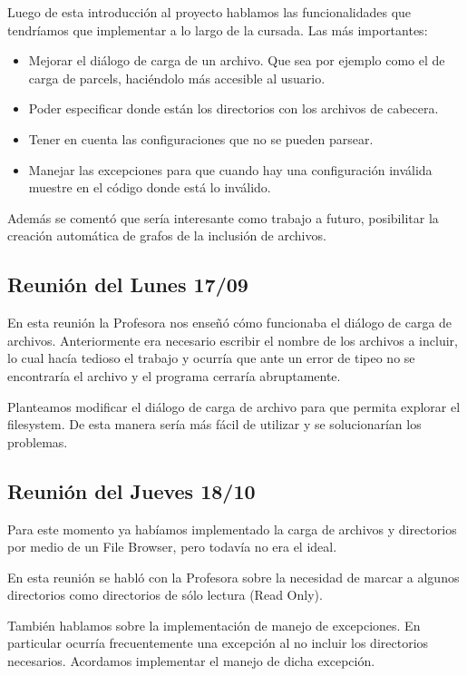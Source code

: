 \documentclass[a4paper,oneside,12pt]{article}
\begin{document}
Luego de esta introducci\'on al proyecto hablamos las funcionalidades que tendr\'iamos que implementar a lo largo de la cursada. Las m\'as importantes:

\begin{itemize}
  \item Mejorar el di\'alogo de carga de un archivo. Que sea por ejemplo como el de carga de parcels, haci\'endolo m\'as accesible al usuario.
  \item Poder especificar donde est\'an los directorios con los archivos de cabecera.
  \item Tener en cuenta las configuraciones que no se pueden parsear.
  \item Manejar las excepciones para que cuando hay una configuraci\'on inv\'alida muestre en el c\'odigo donde est\'a lo inv\'alido. 
\end{itemize}

Adem\'as se coment\'o que ser\'ia interesante como trabajo a futuro, posibilitar la creaci\'on autom\'atica de grafos de la inclusi\'on de archivos.

\subsection{Reuni\'on del Lunes 17/09}
En esta reuni\'on la Profesora nos enseñ\'o c\'omo funcionaba el di\'alogo de carga de archivos. Anteriormente era necesario escribir el nombre de los archivos a incluir, lo cual hac\'ia tedioso el trabajo y ocurr\'ia que ante un error de tipeo no se encontrar\'ia el archivo y el programa cerrar\'ia abruptamente. 

Planteamos modificar el di\'alogo de carga de archivo para que permita explorar el filesystem. De esta manera ser\'ia m\'as f\'acil de utilizar y se solucionar\'ian los problemas.

\subsection{Reuni\'on del Jueves 18/10}
Para este momento ya hab\'iamos implementado la carga de archivos y directorios por medio de un File Browser, pero todav\'ia no era el ideal.

En esta reuni\'on se habl\'o con la Profesora sobre la necesidad de marcar a algunos directorios como directorios de s\'olo lectura (Read Only).

Tambi\'en hablamos sobre la implementaci\'on de manejo de excepciones. En particular ocurr\'ia frecuentemente una excepci\'on al no incluir los directorios necesarios. Acordamos implementar el manejo de dicha excepci\'on.
\end{document}
